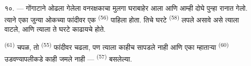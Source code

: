 १०. ---  गोंगाटाने ओढला गेलेला वनरक्षकाचा मुलगा घराबाहेर आला आणि
आम्ही दोघे पुन्हा रानात गेलो. त्याने एका जुन्या ओकच्या फांदीवर एक 
\textsuperscript{(56)} पाहिला होता. तिचे घरटे  \textsuperscript{(58)} लपले
असावे असे त्याला वाटले, आणि त्याला ते घरटे काढायचे होते.

 \textsuperscript{(61)} चपळ, तो  \textsuperscript{(55)}
फांदीवर चढला, पण त्याला काहीच सापडले नाही आणि एका म्हाताऱ्या 
\textsuperscript{(60)} उडवण्यापलीकडे काही जमले नाही —  \textsuperscript{(57)}
बसलेल्या.

\VUsaut{4.0mm}
\VUfilet{22mm}
